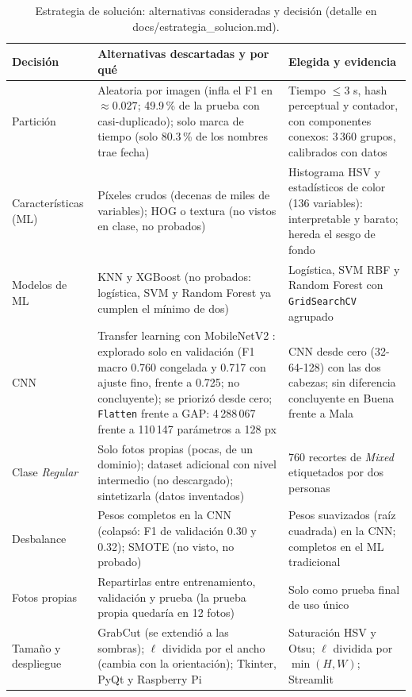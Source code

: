 \documentclass[conference]{IEEEtran}
\begin{document}
\begin{table}[t]
\centering
\caption{Estrategia de soluci\'on: alternativas consideradas y decisi\'on (detalle en {\normalfont\ttfamily docs/estrategia\_solucion.md}).}
\label{tab:alt}
\scriptsize
\begin{tabular}{@{}p{1.9cm}p{6.6cm}p{8.4cm}@{}}
\toprule
Decisi\'on & Alternativas descartadas y por qu\'e & Elegida y evidencia \\
\midrule
Partici\'on & Aleatoria por imagen (infla el F1 en $\approx 0.027$; 49.9\,\% de la prueba con casi-duplicado); solo marca de tiempo (solo 80.3\,\% de los nombres trae fecha) & Tiempo $\le 3$ s, hash perceptual y contador, con componentes conexos: 3\,360 grupos, calibrados con datos \\
Caracter\'isticas (ML) & P\'ixeles crudos (decenas de miles de variables); HOG o textura (no vistos en clase, no probados) & Histograma HSV y estad\'isticos de color (136 variables): interpretable y barato; hereda el sesgo de fondo \\
Modelos de ML & KNN y XGBoost (no probados: log\'istica, SVM y Random Forest ya cumplen el m\'inimo de dos) & Log\'istica, SVM RBF y Random Forest con \texttt{GridSearchCV} agrupado \\
CNN & Transfer learning con MobileNetV2 \cite{sandler2018mobilenetv2}: explorado solo en validaci\'on (F1 macro 0.760 congelada y 0.717 con ajuste fino, frente a 0.725; no concluyente); se prioriz\'o desde cero; \texttt{Flatten} frente a GAP: 4\,288\,067 frente a 110\,147 par\'ametros a 128 px & CNN desde cero (32-64-128) con las dos cabezas; sin diferencia concluyente en Buena frente a Mala \\
Clase \emph{Regular} & Solo fotos propias (pocas, de un dominio); dataset adicional con nivel intermedio (no descargado); sintetizarla (datos inventados) & 760 recortes de \emph{Mixed} etiquetados por dos personas \\
Desbalance & Pesos completos en la CNN (colaps\'o: F1 de validaci\'on 0.30 y 0.32); SMOTE (no visto, no probado) & Pesos suavizados (ra\'iz cuadrada) en la CNN; completos en el ML tradicional \\
Fotos propias & Repartirlas entre entrenamiento, validaci\'on y prueba (la prueba propia quedar\'ia en 12 fotos) & Solo como prueba final de uso \'unico \\
Tama\~no y despliegue & GrabCut (se extendi\'o a las sombras); $\ell$ dividida por el ancho (cambia con la orientaci\'on); Tkinter, PyQt y Raspberry Pi & Saturaci\'on HSV y Otsu; $\ell$ dividida por $\min(H,W)$; Streamlit \\
\bottomrule
\end{tabular}
\end{table}
\end{document}
